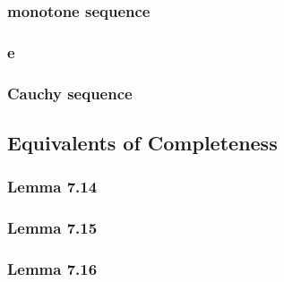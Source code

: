 \documentclass[a4paper]{article}
\begin{document}
\subsubsection*{monotone sequence}
\subsubsection*{e}
\subsubsection*{Cauchy sequence}

\newpage
\subsection{Equivalents of Completeness}   %
\subsubsection*{Lemma 7.14}
\subsubsection*{Lemma 7.15}
\subsubsection*{Lemma 7.16}
\end{document}
